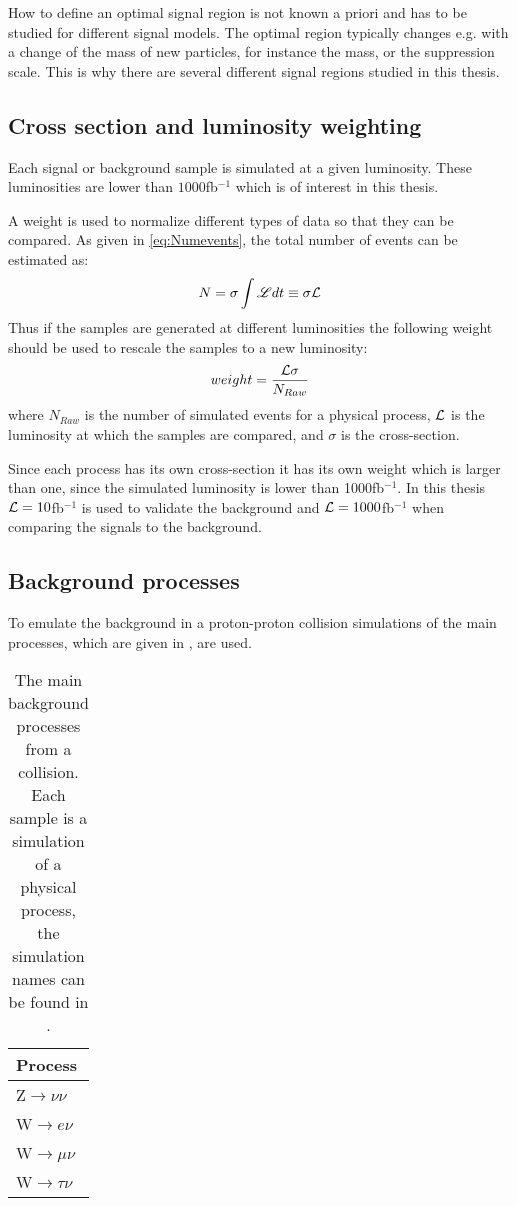How to define an optimal signal region is not known a priori and has to be studied for different signal models. The optimal region typically changes e.g. with a change of the mass of new particles, for instance the \abbrWIMP mass, or the suppression scale. This is why there are several different signal regions studied in this thesis.

\subsection{Cross section and luminosity weighting}
Each signal or background sample is simulated at a given luminosity. These luminosities are lower than $1000$fb$^{-1}$ which is of interest in this thesis. 

A weight is used to normalize different types of data so that they can be compared. 
As given in \eqref{eq:Numevents}, the total number of events can be estimated as:
\begin{equation*}
N=\sigma \int \mathscr{L} dt \equiv \sigma \mathcal{L}
\end{equation*}
Thus if the samples are generated at different luminosities the following weight should be used to rescale the samples to a new luminosity:
\begin{equation}
weight=\frac{\mathcal{L} \sigma}{N_{Raw}}
\end{equation}
where $N_{Raw}$ is the number of simulated events for a physical process, $\mathcal{L}$ is the luminosity at which the samples are compared, and $\sigma$ is the cross-section. 

Since each process has its own cross-section it has its own weight which is larger than one, since the simulated luminosity is lower than 1000fb$^{-1}$.
In this thesis $\mathcal{L}=10$fb$^{-1}$ is used to validate the background and $\mathcal{L}=1000$fb$^{-1}$ when comparing the signals to the background.


\subsection{Background processes}
To emulate the background in a proton-proton collision simulations of the main processes, which are given in , are used. 
\begin{table}[ht]
\begin{tabular}{|l|}
\hline
Process \\ \hline
Z$\rightarrow \nu \nu$ \\
W$\rightarrow e\nu$ \\
W$\rightarrow \mu \nu$ \\
W$\rightarrow \tau \nu$ \\ \hline
\end{tabular}
\caption{The main background processes from a collision. Each sample is a simulation of a physical process, the simulation names can be found in .}
\label{tab:backproc2}
\end{table}

